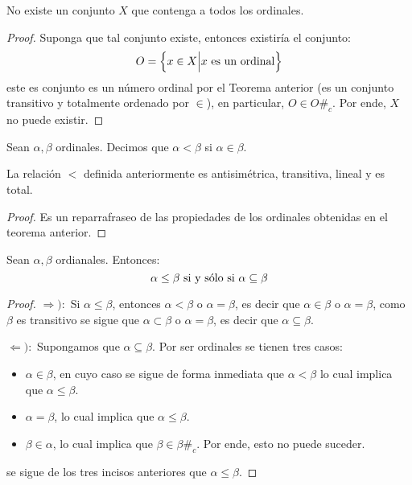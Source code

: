 \documentclass[12pt]{report}
\newcounter{it}
\theoremstyle{largebreak}
\newcommand\contradiction{\ensuremath{\#_c}}
\begin{document}
    \begin{cor}
        No existe un conjunto $X$ que contenga a todos los ordinales.
    \end{cor}

    \begin{proof}
        Suponga que tal conjunto existe, entonces existiría el conjunto:
        \begin{equation*}
            O=\left\{x\in X\Big|x\textup{ es un ordinal} \right\}
        \end{equation*}
        este es conjunto es un número ordinal por el Teorema anterior (es un conjunto transitivo y totalmente ordenado por $\in$), en particular, $O\in O$\contradiction. Por ende, $X$ no puede existir.
    \end{proof}

    \begin{mydef}
        Sean $\alpha,\beta$ ordinales. Decimos que $\alpha<\beta$ si $\alpha\in\beta$.
    \end{mydef}

    \begin{propo}
        La relación $<$ definida anteriormente es antisimétrica, transitiva, lineal y es total.
    \end{propo}

    \begin{proof}
        Es un reparrafraseo de las propiedades de los ordinales obtenidas en el teorema anterior.
    \end{proof}

    \begin{propo}
        Sean $\alpha,\beta$ ordianales. Entonces:
        \begin{equation*}
            \alpha\leq\beta\textup{ si y sólo si }\alpha\subseteq\beta
        \end{equation*}
    \end{propo}

    \begin{proof}
        $\Rightarrow):$ Si $\alpha\leq\beta$, entonces $\alpha<\beta$ o $\alpha=\beta$, es decir que $\alpha\in\beta$ o $\alpha=\beta$, como $\beta$ es transitivo se sigue que $\alpha\subset\beta$ o $\alpha=\beta$, es decir que $\alpha\subseteq\beta$.
        
        $\Leftarrow):$ Supongamos que $\alpha\subseteq\beta$. Por ser ordinales se tienen tres casos:
        \begin{itemize}
            \item $\alpha\in\beta$, en cuyo caso se sigue de forma inmediata que $\alpha<\beta$ lo cual implica que $\alpha\leq\beta$.
            \item $\alpha=\beta$, lo cual implica que $\alpha\leq\beta$.
            \item $\beta\in\alpha$, lo cual implica que $\beta\in\beta$\contradiction. Por ende, esto no puede suceder.
        \end{itemize}
        se sigue de los tres incisos anteriores que $\alpha\leq\beta$.
    \end{proof}
\end{document}
